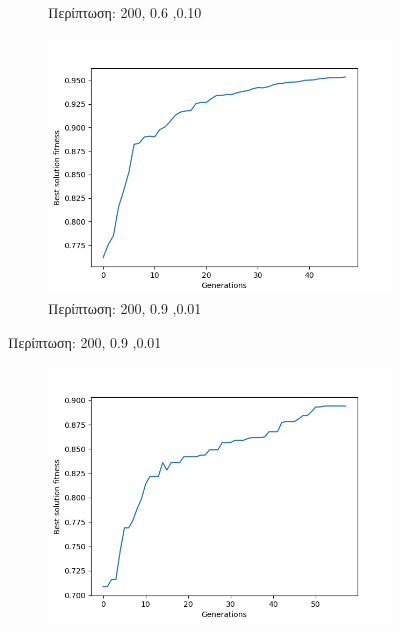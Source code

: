 \documentclass[12pt,a4paper]{article}
\begin{document}
\begin{enumerate}[a)]
\begin{figure}[H]
\begin{subfigure}[h]{0.7\textwidth}
                         \caption*{Περίπτωση: 200, 0.6 ,0.10}
                     \end{subfigure}
                     \begin{subfigure}[h]{0.7\textwidth}
                         \centering
                         \includegraphics[width=\textwidth]{images/9s.png}
                         \caption*{Περίπτωση: 200, 0.9 ,0.01}
                     \end{subfigure}
                 \end{figure}
                 \begin{figure}[H]
                     \centering
                     \begin{subfigure}[ht]{0.7\textwidth}
                         \centering
                         \includegraphics[width=\textwidth]{images/10s.png}

\end{subfigure}
\end{figure}
\end{enumerate}
\end{document}
